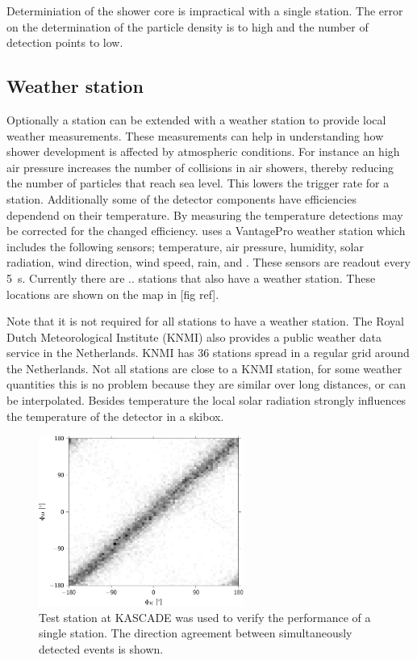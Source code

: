 Determiniation of the shower core is impractical with a single station. The error on the determination of the particle density is to high and the number of detection points to low.

\subsection{Weather station}

Optionally a \hisparc station can be extended with a weather station to provide local weather measurements. These measurements can help in understanding how shower development is affected by atmospheric conditions. For instance an high air pressure increases the number of collisions in air showers, thereby reducing the number of particles that reach sea level. This lowers the trigger rate for a station. Additionally some of the detector components have efficiencies dependend on their temperature. By measuring the temperature detections may be corrected for the changed efficiency. \hisparc uses a VantagePro weather station which includes the following sensors; temperature, air pressure, humidity, solar radiation, wind direction, wind speed, rain, and . These sensors are readout every \SI{5}{\second}. Currently there are .. \hisparc stations that also have a weather station. These locations are shown on the map in [fig ref].

Note that it is not required for all stations to have a weather station. The Royal Dutch Meteorological Institute (KNMI) also provides a public weather data service in the Netherlands. KNMI has 36 stations spread in a regular grid around the Netherlands. Not all \hisparc stations are close to a KNMI station, for some weather quantities this is no problem because they are similar over long distances, or can be interpolated. Besides temperature the local solar radiation strongly influences the temperature of the detector in a skibox.

\begin{figure}
    \centering
    \includegraphics[width=0.6\textwidth]
                    {plots/experiment/azimuth_kascade_minn1}
    \caption{Test station at KASCADE was used to verify the performance of a single station. The direction agreement between simultaneously detected events is shown.}
    \label{fig:azimuth_kascade_minn1}
\end{figure}


